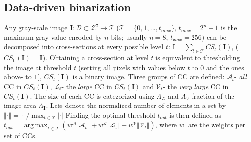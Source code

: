 \documentclass{article}
\def\I{{\mathbf I}}
\def\mcT{{\mathcal{T}}}
\def\mcD{{\mathcal{D}}}
\def\mcA{{\mathcal{A}}}
\def\mcL{{\mathcal{L}}}
\def\mcV{{\mathcal{V}}}
\DeclareMathOperator*{\argmax}{arg\,max}
\begin{document}
\subsection{Data-driven binarization}
\label{ssec:binarize}
Any gray-scale image  $\I: \mcD \subset \mathcal{Z}^2 \rightarrow \mcT $ ($\mcT = \{0,1, ..., t_{max}\}$, $t_{max} = 2^n-1$ is the maximum
gray value encoded by $n$ bits; usually $n=8$, $t_{max} = 256$) can be decomposed into cross-sections at
every possible level $t$:  $\I = \sum_{t \in \mcT}CS_t(\I)$, 
($CS_0(\I) = \I$). Obtaining a cross-section at level $t$ is equivalent to thresholding the image at threshold $t$ (setting all pixels with values below $t$ to $0$ and the ones above- to $1$), $CS_t(\I)$ is a binary image. 
Three groups of CC are defined: $\mcA_t$- {\em all} CC in $CS_t(\I)$, $\mcL_t$- the {\em large} CC in $CS_t(\I)$ and 
$\mcV_t$- the {\em very large} CC in $CS_t(\I)$.  The size of each CC is categorized using $\Lambda_{\mcL}$ and $\Lambda_{\mcV}$ fraction of the image area $A_{\I}$. Lets denote the normalized number of elements in a set by $\Vert \cdot \Vert = |\cdot| / \max_{t \in \mcT}|\cdot|$
Finding the optimal threshold $t_{opt}$ is then defined as
$t_{opt} = \argmax_{t \in \mcT}( w^{\mcA} \Vert \mcA_t \Vert + w^{\mcL} \Vert \mcL_t \Vert + w^{\mcV} \Vert \mcV_t \Vert )$,
where $w^{\cdot}$ are the weights per set of CCs.  
\end{document}
